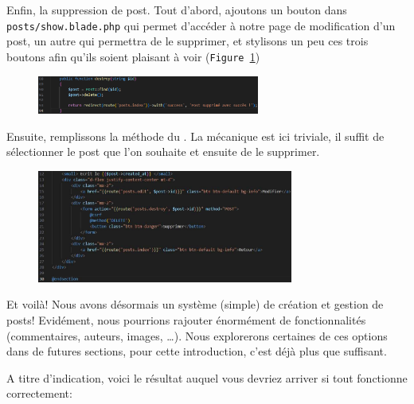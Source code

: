 \documentclass[internal]{nhitec_design}
\begin{document}
\label{sec:posts_delete}

Enfin, la suppression de post. Tout d'abord, ajoutons un bouton dans \verb|posts/show.blade.php| qui permet d'accéder à notre page de modification d'un post, un autre qui permettra de le supprimer, et stylisons un peu ces trois boutons afin qu'ils soient plaisant à voir (\texttt{Figure~\ref{fig:post_delete_blade}})

\begin{figure}
    \vspace{-0.5cm}
    \includegraphics[width=0.65\textwidth]{figures-C1/post_delete_controller.pdf}
\end{figure}
Ensuite, remplissons la méthode du \controller{}. La mécanique est ici triviale, il suffit de sélectionner le post que l'on souhaite et ensuite de le supprimer.

\begin{figure}[!h]
    \centering
    \includegraphics[width=0.75\textwidth]{figures-C1/post_delete_blade.pdf}
    \caption{\label{fig:post_delete_blade}}
\end{figure}

Et voilà! Nous avons désormais un système (simple) de création et gestion de posts! Evidément, nous pourrions rajouter énormément de fonctionnalités (commentaires, auteurs, images, \ldots). Nous explorerons certaines de ces options dans de futures sections, pour cette introduction, c'est déjà plus que suffisant.

A titre d'indication, voici le résultat auquel vous devriez arriver si tout fonctionne correctement:
\end{document}
